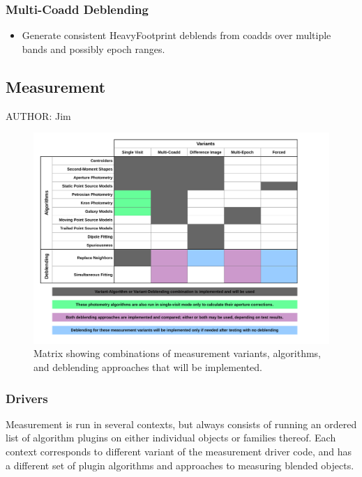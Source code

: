 \subsubsection{Multi-Coadd Deblending}
\label{sec:acMultiCoaddDeblending}
\begin{itemize}
\item Generate consistent HeavyFootprint deblends from coadds over multiple bands and possibly epoch ranges.
\end{itemize}

\subsection{Measurement}
\label{sec:acMeasurement}
AUTHOR: Jim

\begin{figure}
\centering
\includegraphics[width=\textwidth]{figures/measurement-matrix.pdf}
\caption{Matrix showing combinations of measurement variants, algorithms, and deblending approaches that will be implemented.
\label{fig:measurement-matrix}}
\end{figure}

\subsubsection{Drivers}
Measurement is run in several contexts, but always consists of running an ordered list of algorithm plugins on either individual objects or families thereof.  Each context corresponds to different variant of the measurement driver code, and has a different set of plugin algorithms and approaches to measuring blended objects.

